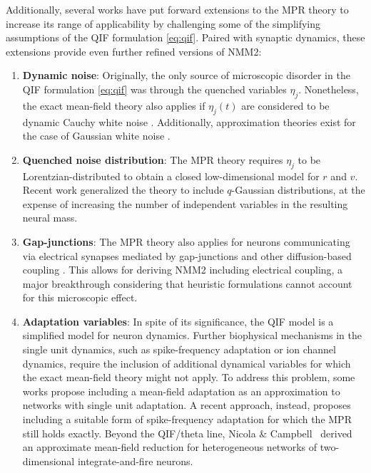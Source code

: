 \documentclass[12pt]{article}
\numberwithin{equation}{section}
\newcommand{\rev}[1]{\begingroup\color{blue}#1\endgroup}
\begin{document}
Additionally,
several works have put forward extensions to the MPR theory to increase its range
of applicability by challenging some of the simplifying assumptions of the QIF formulation \eqref{eq:qif}.
Paired with synaptic dynamics, these extensions provide even further refined versions of NMM2:

\begin{enumerate}
    \item \textbf{Dynamic noise}: Originally, the only source of microscopic disorder in the QIF formulation \eqref{eq:qif} was through the quenched variables $\eta_j$.
    Nonetheless, the exact mean-field theory also applies if $\eta_j(t)$ are considered to be
    dynamic Cauchy white noise \cite{clusella2024}. Additionally, approximation theories exist for the case of Gaussian white noise \cite{Goldobin2021,Goldobin2021_2}.
    \item \textbf{Quenched noise distribution}: The MPR theory requires $\eta_j$ to be Lorentzian-distributed to obtain a closed low-dimensional model for $r$ and $v$.
    Recent work generalized the theory to include $q$-Gaussian distributions, at the expense of
    increasing the number of independent variables in the resulting neural mass\cite{PP22,PP24}. 
    \item \textbf{Gap-junctions}: The MPR theory also applies for neurons communicating via electrical synapses mediated by gap-junctions and other diffusion-based coupling \cite{Pietras2019,Montbrio:2020aa}. This allows for deriving NMM2 including electrical coupling, a major breakthrough considering that heuristic formulations cannot account for this microscopic effect. 
    \item \textbf{Adaptation variables}: In spite of its significance, the QIF model is a simplified model for neuron dynamics. Further biophysical mechanisms in the single unit dynamics, such as spike-frequency adaptation or ion channel dynamics, require the inclusion of additional dynamical variables for which the exact mean-field theory might not apply.
    To address this problem, some works propose including a mean-field adaptation as an approximation to networks with single unit adaptation\cite{chenExactMeanfieldModels2022,ferraraPopulationSpikingBursting2023}. 
    A recent approach, instead, proposes including a suitable form of spike-frequency adaptation for which the MPR still holds exactly\cite{Pietras2025}. \rev{Beyond the QIF/theta line, Nicola \& Campbell~\cite{NicolaCampbell2013} derived an approximate mean-field reduction for heterogeneous networks of two-dimensional integrate-and-fire neurons.}

\end{enumerate}
\end{document}
